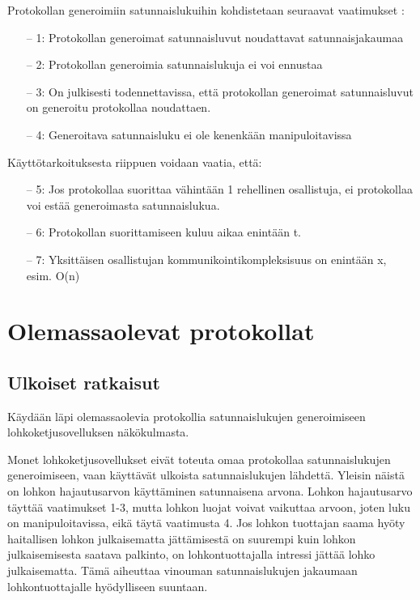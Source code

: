 \documentclass{article}
\begin{document}
Protokollan generoimiin satunnaislukuihin kohdistetaan seuraavat vaatimukset \cite{simic_review_2020}:
\begin{itemize}
    \item[--] 1: Protokollan generoimat satunnaisluvut noudattavat satunnaisjakaumaa
    \item[--] 2: Protokollan generoimia satunnaislukuja ei voi ennustaa
    \item[--] 3: On julkisesti todennettavissa, että protokollan generoimat satunnaisluvut on generoitu protokollaa noudattaen.
    \item[--] 4: Generoitava satunnaisluku ei ole kenenkään manipuloitavissa
\end{itemize}\textbf{}
Käyttötarkoituksesta riippuen voidaan vaatia, että:

\begin{itemize}
    \item[--] 5: Jos protokollaa suorittaa vähintään 1 rehellinen osallistuja, ei protokollaa voi estää generoimasta satunnaislukua.
    \item[--] 6: Protokollan suorittamiseen kuluu aikaa enintään t.
    \item[--] 7: Yksittäisen osallistujan kommunikointikompleksisuus on enintään x, esim. O(n)
\end{itemize}

\section{Olemassaolevat protokollat}

\subsection{Ulkoiset ratkaisut}
Käydään läpi olemassaolevia protokollia satunnaislukujen generoimiseen lohkoketjusovelluksen näkökulmasta. 

Monet lohkoketjusovellukset eivät toteuta omaa protokollaa satunnaislukujen generoimiseen, vaan käyttävät ulkoista satunnaislukujen lähdettä. Yleisin näistä on lohkon hajautusarvon käyttäminen satunnaisena arvona. Lohkon hajautusarvo täyttää vaatimukset 1-3, mutta lohkon luojat voivat vaikuttaa arvoon, joten luku on manipuloitavissa, eikä täytä vaatimusta 4. Jos lohkon tuottajan saama hyöty haitallisen lohkon julkaisematta jättämisestä on suurempi kuin lohkon julkaisemisesta saatava palkinto, on lohkontuottajalla intressi jättää lohko julkaisematta. Tämä aiheuttaa vinouman satunnaislukujen jakaumaan lohkontuottajalle hyödylliseen suuntaan.
\end{document}
